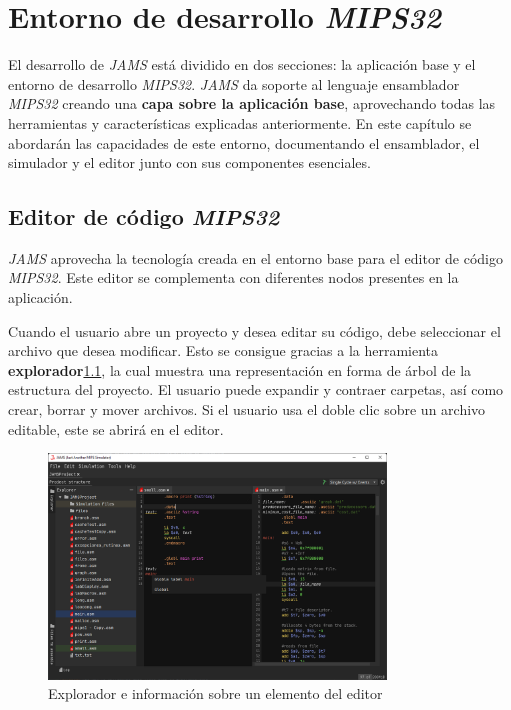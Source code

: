 \chapter{Entorno de desarrollo \textit{MIPS32}}\label{ch:entorno-de-desarrollo-mips32}

El desarrollo de \textit{JAMS} está dividido en dos secciones:
la aplicación base y el entorno de desarrollo \textit{MIPS32}.
\textit{JAMS} da soporte al lenguaje ensamblador \textit{MIPS32}
creando una \textbf{capa sobre la aplicación base},
aprovechando todas las herramientas y características explicadas anteriormente.
En este capítulo se abordarán las capacidades de este entorno,
documentando el ensamblador, el simulador y el editor junto
con sus componentes esenciales.


\section{Editor de código \textit{MIPS32}}\label{sec:editor-de-codigo-mips32}

\textit{JAMS} aprovecha la tecnología creada en el entorno base
para el editor de código \textit{MIPS32}.
Este editor se complementa con diferentes nodos presentes en la
aplicación.

Cuando el usuario abre un proyecto y desea editar su código,
debe seleccionar el archivo que desea modificar.
Esto se consigue gracias a la herramienta \textbf{explorador}\ref{fig:jams-explorer-text-hover}, la cual
muestra una representación en forma de árbol de la estructura del proyecto.
El usuario puede expandir y contraer carpetas, así como crear, borrar y
mover archivos.
Si el usuario usa el doble clic sobre un archivo editable, este se abrirá
en el editor.

\begin{figure}[h]
    \centering
    \includegraphics[width=0.8\textwidth]{images/mips/jams-text-hover}
    \caption{Explorador e información sobre un elemento del editor}
    \label{fig:jams-explorer-text-hover}
\end{figure}


